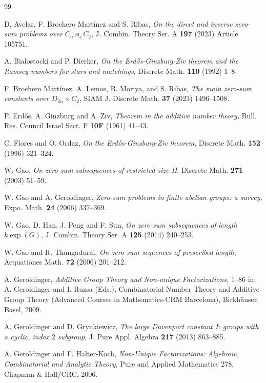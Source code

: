 \documentclass[a4paper, 12pt]{article}
\theoremstyle{definition}
\begin{document}
\begin{thebibliography}{99}

D. Avelar, F. Brochero Mart\'{\i}nez and S. Ribas,
\emph{On the direct and inverse zero-sum problems over
$C_n\rtimes_s C_2$},
J. Combin. Theory Ser. A \textbf{197} (2023) Article 105751.

A. Bialostocki and P. Dierker,
\emph{On the Erd\H{o}s-Ginzburg-Ziv theorem and the Ramsey
numbers for stars and matchings},
Discrete Math. \textbf{110} (1992) 1--8.

 F. Brochero Mart\'inez, A. Lemos, B. Moriya, and S. Ribas,
\emph{The main zero-sum constants over $D_{2n}\times C_2$},
SIAM J. Discrete Math. \textbf{37} (2023) 1496--1508.

P. Erd\H{o}s, A. Ginzburg and A. Ziv,
\emph{Theorem in the additive number theory,}
Bull. Res. Council Israel Sect. F \textbf{10F} (1961) 41--43.

C. Flores and O. Ordaz,
\emph{On the Erd\H{o}s-Ginzburg-Ziv theorem},
Discrete Math. \textbf{152} (1996) 321--324.


W. Gao,
\emph{On zero-sum subsequences of restricted size II},
Discrete Math. \textbf{271} (2003) 51--59.

 W. Gao and A. Geroldinger, \emph{Zero-sum problems in finite abelian groups:
a survey,} Expo. Math.  \textbf{24} (2006) 337--369.

W. Gao, D. Han, J. Peng and F. Sun,
\emph{On zero-sum subsequences of length $k\exp(G)$},
J. Combin. Theory Ser. A \textbf{125} (2014) 240--253.

W. Gao and R. Thangadurai,
\emph{On zero-sum sequences of prescribed length},
Aequationes Math. \textbf{72} (2006) 201--212.

 A. Geroldinger, \emph{Additive Group Theory and Non-unique Factorizations,} 1--86 in: A. Geroldinger and I. Ruzsa (Eds.), Combinatorial Number
Theory and Additive Group Theory (Advanced Courses in Mathematics-CRM Barcelona), Birkh\"{a}user, Basel, 2009.

 A. Geroldinger and D. Grynkiewicz, \emph{The large Davenport constant I: groups with a cyclic, index $2$ subgroup}, J. Pure Appl. Algebra \textbf{217} (2013) 863--885.

A. Geroldinger and F. Halter-Koch,
\emph{Non-Unique Factorizations: Algebraic, Combinatorial and
Analytic Theory},
Pure and Applied Mathematics 278, Chapman \& Hall/CRC, 2006.



\end{thebibliography}
\end{document}
